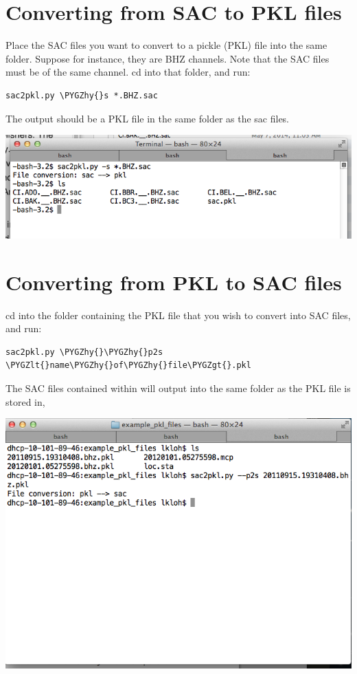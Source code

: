 \documentclass[letterpaper,10pt,english]{sphinxmanual}
\def\PYGZlt{\char`\<}
\def\PYGZgt{\char`\>}
\def\PYGZhy{\char`\-}
\begin{document}
\section{Converting from SAC to PKL files}
\label{docfiles/sacioAIMBAT:converting-from-sac-to-pkl-files}
Place the SAC files you want to convert to a pickle (PKL) file into the same folder. Suppose for instance, they are BHZ channels. Note that the SAC files must be of the same channel. cd into that folder, and run:

\begin{Verbatim}[commandchars=\\\{\}]
sac2pkl.py \PYGZhy{}s *.BHZ.sac
\end{Verbatim}

The output should be a PKL file in the same folder as the sac files.

\includegraphics{sac_to_pkl_conversion.png}


\section{Converting from PKL to SAC files}
\label{docfiles/sacioAIMBAT:converting-from-pkl-to-sac-files}
cd into the folder containing the PKL file that you wish to convert into SAC files, and run:

\begin{Verbatim}[commandchars=\\\{\}]
sac2pkl.py \PYGZhy{}\PYGZhy{}p2s \PYGZlt{}name\PYGZhy{}of\PYGZhy{}file\PYGZgt{}.pkl
\end{Verbatim}

The SAC files contained within will output into the same folder as the PKL file is stored in,

\includegraphics{pkl_to_sac_conversion.png}
\end{document}
